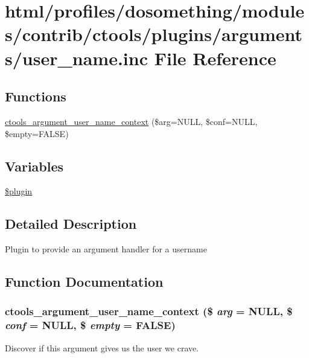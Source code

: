 \hypertarget{user__name_8inc}{
\section{html/profiles/dosomething/modules/contrib/ctools/plugins/arguments/user\_\-name.inc File Reference}
\label{user__name_8inc}
}
\subsection*{Functions}
\begin{DoxyCompactItemize}
\item 
\hyperlink{user__name_8inc_ad4a7c8ebb4a32658ed945de104a1e2c4}{ctools\_\-argument\_\-user\_\-name\_\-context} (\$arg=NULL, \$conf=NULL, \$empty=FALSE)
\end{DoxyCompactItemize}
\subsection*{Variables}
\begin{DoxyCompactItemize}
\item 
\hyperlink{user__name_8inc_ada8a7130088351710bb02ed622d6bf65}{\$plugin}
\end{DoxyCompactItemize}


\subsection{Detailed Description}
Plugin to provide an argument handler for a username 

\subsection{Function Documentation}
\hypertarget{user__name_8inc_ad4a7c8ebb4a32658ed945de104a1e2c4}{
\subsubsection[{ctools\_\-argument\_\-user\_\-name\_\-context}]{\setlength{\rightskip}{0pt plus 5cm}ctools\_\-argument\_\-user\_\-name\_\-context (\$ {\em arg} = {\ttfamily NULL}, \/  \$ {\em conf} = {\ttfamily NULL}, \/  \$ {\em empty} = {\ttfamily FALSE})}}
\label{user__name_8inc_ad4a7c8ebb4a32658ed945de104a1e2c4}
Discover if this argument gives us the user we crave. 


